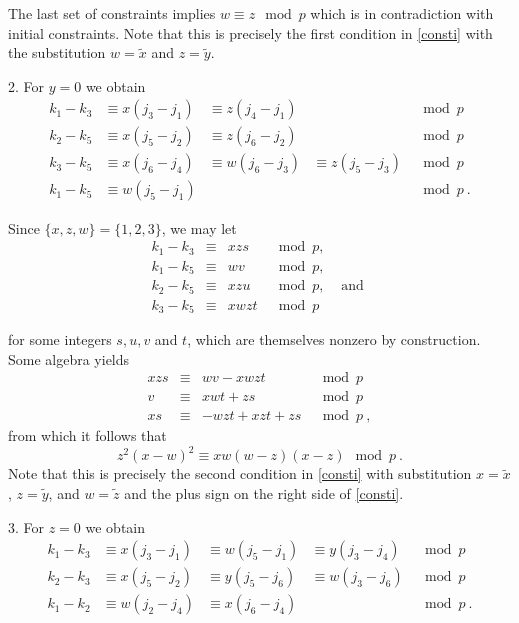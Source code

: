 The last set of constraints implies $w\equiv z \mod p$ which is in
contradiction with initial constraints. Note that this is precisely
the first condition in \eqref{consti} with the substitution
$w=\tilde{x}$ and $z=\tilde{y}$.

2. For $y=0$ we obtain \begin{equation}\begin{array}{cccccc} k_1-k_3
&\equiv x(j_3-j_1)& \equiv z(j_4-j_1)& {} &\mod p
\\
k_2-k_5 &\equiv x(j_5-j_2) &\equiv  z(j_6-j_2) &{} &\mod
p\\
k_3-k_5 &\equiv x(j_6-j_4) &\equiv w(j_6-j_3) &
\equiv z(j_5-j_3)&\mod p\\
k_1-k_5 &\equiv w(j_5-j_1) & {} & {} &\mod p~.
\end{array}\end{equation}

Since $\{x,z,w\}=\{1,2,3\}$, we may let
\begin{equation}\begin{array}{ccccc}k_1-k_3 &\equiv& xzs &\mod p, &{} \\
k_1-k_5 &\equiv & wv &\mod p, &{}\\ k_2-k_5 &\equiv& xzu &\mod p,
&\text{ and }\\k_3-k_5 &\equiv& xwzt &\mod p&{}
\end{array}\end{equation}

for some integers $s,u,v$ and $t$, which are themselves nonzero by
construction. Some algebra yields
\begin{equation}\begin{array}{cccc}
xzs &\equiv &wv-xwzt &\mod p \\
v &\equiv &xwt+zs &\mod p \\
xs & \equiv& -wzt +xzt+zs &\mod p~,
\end{array}\end{equation}
from which it follows that
\begin{equation}
z^2(x-w)^2 \equiv xw(w-z)(x-z) \mod p~.
\end{equation}
Note that this is precisely the second condition in \eqref{consti}
with substitution $x=\tilde{x}$, $z=\tilde{y}$, and $w=\tilde{z}$
and the plus sign on the right side of \eqref{consti}.

3. For $z=0$ we obtain
\begin{equation}\begin{array}{ccccc} k_1-k_3
&\equiv x(j_3-j_1)& \equiv w(j_5-j_1)& \equiv y(j_3-j_4) &\mod p
\\
k_2-k_3 &\equiv x(j_5-j_2) &\equiv  y(j_5-j_6) &\equiv w(j_3-j_6)
&\mod
p\\
k_1-k_2 &\equiv w(j_2-j_4) &\equiv x(j_6-j_4) & {}&\mod p~.
\end{array}\end{equation}


